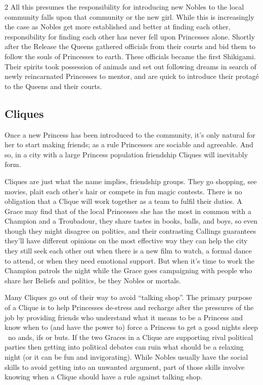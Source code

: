 \begin{multicols}{2}
All this presumes the responsibility for introducing new Nobles to the local community falls upon that community or the new girl. While this is increasingly the case as Nobles get more established and better at finding each other, responsibility for finding each other has never fell upon Princesses alone. Shortly after the Release the Queens gathered officials from their courts and bid them to follow the souls of Princesses to earth. These officials became the first Shikigami. Their spirits took possession of animals and set out following dreams in search of newly reincarnated Princesses to mentor, and are quick to introduce their protag\'e to the Queens and their courts. 

\subsection*{Cliques}

Once a new Princess has been introduced to the community, it's only natural for her to start making friends; as a rule Princesses are sociable and agreeable. And so, in a city with a large Princess population friendship Cliques will inevitably form. 

Cliques are just what the name implies, friendship groups. They go shopping, see movies, plait each other's hair or compete in fun magic contests. There is no obligation that a Clique will work together as a team to fulfil their duties. A Grace may find that of the local Princesses she has the most in common with a Champion and a Troubadour, they share tastes in books, balls, and boys, so even though they might disagree on politics, and their contrasting Callings guarantees they'll have different opinions on the most effective way they can help the city they still seek each other out when there is a new film to watch, a formal dance to attend, or when they need emotional support. But when it's time to work the Champion patrols the night while the Grace goes campaigning with people who share her Beliefs and politics, be they Nobles or mortals.  

Many Cliques go out of their way to avoid \textquotedblleft talking shop\textquotedblright . The primary purpose of a Clique is to help Princesses de-stress and recharge after the pressures of the job by providing friends who understand what it means to be a Princess and know when to (and have the power to) force a Princess to get a good nights sleep \textendash\, no ands, ifs or buts. If the two Graces in a Clique are supporting rival political parties then getting into political debates can ruin what should be a relaxing night (or it can be fun and invigorating). While Nobles usually have the social skills to avoid getting into an unwanted argument, part of those skills involve knowing when a Clique should have a rule against talking shop.


\end{multicols}
